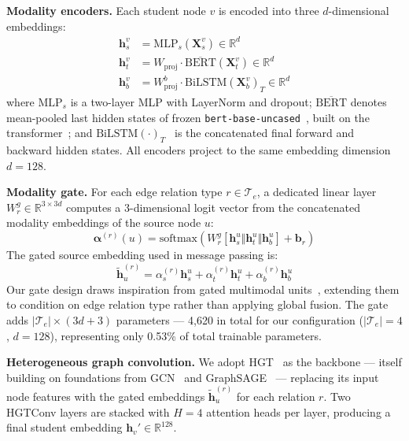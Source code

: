 \documentclass[sigconf]{acmart}
\begin{document}
\textbf{Modality encoders.}
Each student node $v$ is encoded into three
$d$-dimensional embeddings:
\begin{align}
  \mathbf{h}_s^v &= \text{MLP}_s(\mathbf{X}_s^v)
    \in \mathbb{R}^d \label{eq:struct-enc} \\
  \mathbf{h}_t^v &= W_{\text{proj}} \cdot
    \overline{\text{BERT}}(\mathbf{X}_t^v)
    \in \mathbb{R}^d \label{eq:text-enc} \\
  \mathbf{h}_b^v &= W_{\text{proj}}^b \cdot
    \text{BiLSTM}(\mathbf{X}_b^v)_{T}
    \in \mathbb{R}^d \label{eq:behav-enc}
\end{align}
where $\text{MLP}_s$ is a two-layer MLP with
LayerNorm and dropout; $\overline{\text{BERT}}$
denotes mean-pooled last hidden states of frozen
\texttt{bert-base-uncased}~\citep{devlin2019bert},
built on the transformer~\citep{vaswani2017attention};
and $\text{BiLSTM}(\cdot)_T$~\citep{hochreiter1997long}
is the concatenated final forward and backward hidden
states.
All encoders project to the same embedding
dimension $d = 128$.

\textbf{Modality gate.}
For each edge relation type $r \in \mathcal{T}_e$,
a dedicated linear layer $W_r^g \in
\mathbb{R}^{3 \times 3d}$ computes a 3-dimensional
logit vector from the concatenated modality
embeddings of the source node $u$:
\begin{equation}
  \boldsymbol{\alpha}^{(r)}(u) = \text{softmax}
  \!\left( W_r^g \left[ \mathbf{h}_s^u \Vert
  \mathbf{h}_t^u \Vert \mathbf{h}_b^u \right]
  + \mathbf{b}_r \right)
\end{equation}
The gated source embedding used in message passing is:
\begin{equation}
  \tilde{\mathbf{h}}_u^{(r)} =
    \alpha_s^{(r)} \mathbf{h}_s^u +
    \alpha_t^{(r)} \mathbf{h}_t^u +
    \alpha_b^{(r)} \mathbf{h}_b^u
\end{equation}
Our gate design draws inspiration from gated
multimodal units~\citep{arevalo2017gated}, extending
them to condition on edge relation type rather than
applying global fusion.
The gate adds $|\mathcal{T}_e| \times (3d + 3)$
parameters --- 4,620 in total for our configuration
($|\mathcal{T}_e| = 4$, $d = 128$), representing
only 0.53\% of total trainable parameters.

\textbf{Heterogeneous graph convolution.}
We adopt HGT~\citep{hu2020heterogeneous} as the
backbone --- itself building on foundations from
GCN~\citep{kipf2017semi} and
GraphSAGE~\citep{hamilton2017inductive} ---
replacing its input node features with the
gated embeddings $\tilde{\mathbf{h}}_u^{(r)}$ for
each relation $r$. Two HGTConv layers are stacked
with $H = 4$ attention heads per layer, producing
a final student embedding
$\mathbf{h}_v' \in \mathbb{R}^{128}$.
\end{document}
